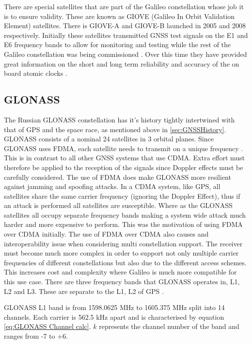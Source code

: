 There are special satellites that are part of the Galileo constellation whose job it is to ensure validity. These are known as GIOVE (Galileo In Orbit Validation Element)
satellites. There is GIOVE-A and GIOVE-B launched in 2005 and 2008 respectively. Initially these satellites transmitted GNSS test signals on the E1 and E6 frequency
bands to allow for monitoring and testing while the rest of the Galileo constellation was being commissioned \cite{RN65}. Over this time they have provided great information on the
short and long term reliability and accuracy of the on board atomic clocks \cite{RN66}.

\subsection{GLONASS} \label{subsec:GNSS_GLONASSIntro}
The Russian GLONASS constellation has it's history tightly intertwined with that of GPS and the space race, as mentioned above in \ref{sec:GNSSHistory}.
GLONASS consists of a nominal 24 satellites in 3 orbital planes. Since GLONASS uses FDMA, each satellite needs to transmit on a unique frequency \cite{RN56}. This is in contrast to
all other GNSS systems that use CDMA. Extra effort must therefore be applied to the reception of the signals since Doppler effects must be carefully considered. 
The use of FDMA does make GLONASS more resilient against jamming and spoofing attacks. In a CDMA system, like GPS, all satellites share the same carrier frequency
(ignoring the Doppler Effect), thus if an attack is performed all satellites are susceptible. Where as the GLONASS satellites all occupy separate frequency bands making a
system wide attack much harder and more expensive to perform. This was the motivation of using FDMA over CDMA initially. The use of FDMA over CDMA also causes and
interoperability issue when considering multi constellation support. The receiver must become much more complex in order to support not only multiple carrier frequencies
of different constellations but also due to the different access schemes. This increases cost and complexity where Galileo is much more compatible for this use case.
There are
three frequency bands that GLONASS operates in, L1, L2 and L3. These are separate to the L1, L2 of GPS \cite{RN70}. 

GLONASS L1 band is from 1598.0625 MHz to 1605.375 MHz split into 14 channels. Each carrier is 562.5 kHz apart and is characterised by equation \ref{eq:GLONASS Channel
calc}. $k$ represents the channel number of the band and ranges from -7 to +6. 

